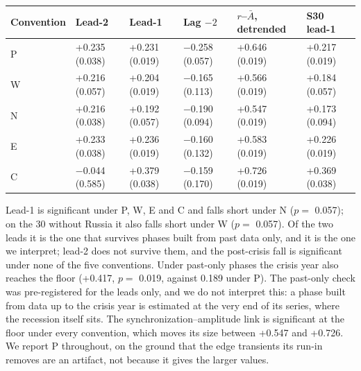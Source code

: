 \documentclass[11pt,a4paper]{article}
\newcounter{none}                    %
\begin{document}
{\def\LTcaptype{none} %
\begin{longtable}[]{@{}
  >{\raggedright\arraybackslash}p{}
  >{\raggedright\arraybackslash}p{}
  >{\raggedright\arraybackslash}p{}
  >{\raggedright\arraybackslash}p{}
  >{\raggedright\arraybackslash}p{}
  >{\raggedright\arraybackslash}p{}@{}}
\toprule\noalign{}
\begin{minipage}[b]{\linewidth}\raggedright
Convention
\end{minipage} & \begin{minipage}[b]{\linewidth}\raggedright
Lead-2
\end{minipage} & \begin{minipage}[b]{\linewidth}\raggedright
Lead-1
\end{minipage} & \begin{minipage}[b]{\linewidth}\raggedright
Lag \(-2\)
\end{minipage} & \begin{minipage}[b]{\linewidth}\raggedright
\(r\)–\(\bar A\), detrended
\end{minipage} & \begin{minipage}[b]{\linewidth}\raggedright
S30 lead-1
\end{minipage} \\
\midrule\noalign{}
\endhead
\bottomrule\noalign{}
\endlastfoot
P & +0.235 (0.038) & +0.231 (0.019) & −0.258 (0.057) & +0.646 (0.019) & +0.217 (0.019) \\
W & +0.216 (0.057) & +0.204 (0.019) & −0.165 (0.113) & +0.566 (0.019) & +0.184 (0.057) \\
N & +0.216 (0.038) & +0.192 (0.057) & −0.190 (0.094) & +0.547 (0.019) & +0.173 (0.094) \\
E & +0.233 (0.038) & +0.236 (0.019) & −0.160 (0.132) & +0.583 (0.019) & +0.226 (0.019) \\
C & −0.044 (0.585) & +0.379 (0.038) & −0.159 (0.170) & +0.726 (0.019) & +0.369 (0.038) \\
\end{longtable}
}

Lead-1 is significant under P, W, E and C and falls short under N (\(p =\) 0.057); on the 30 without Russia it also falls short under W (\(p =\) 0.057). Of the two leads it is the one that survives phases built from past data only, and it is the one we interpret; lead-2 does not survive them, and the post-crisis fall is significant under none of the five conventions. Under past-only phases the crisis year also reaches the floor (+0.417, \(p =\) 0.019, against 0.189 under P). The past-only check was pre-registered for the leads only, and we do not interpret this: a phase built from data up to the crisis year is estimated at the very end of its series, where the recession itself sits. The synchronization–amplitude link is significant at the floor under every convention, which moves its size between +0.547 and +0.726. We report P throughout, on the ground that the edge transients its run-in removes are an artifact, not because it gives the larger values.
\end{document}
